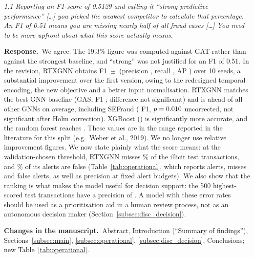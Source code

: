 \documentclass[11pt]{article}
\newenvironment{comment}{\par\medskip\noindent\begin{minipage}{\linewidth}\itshape\color{black!75}}{\end{minipage}\par\smallskip}
\newcommand{\resp}{\par\noindent\textbf{Response.}\ }
\newcommand{\change}{\par\noindent\textbf{Changes in the manuscript.}\ }
\begin{document}
\begin{comment}
1.1 Reporting an F1-score of 0.5129 and calling it ``strong predictive performance'' [\dots] you picked the weakest competitor to calculate that percentage. An F1 of 0.51 means you are missing nearly half of all fraud cases [\dots] You need to be more upfront about what this score actually means.
\end{comment}
\resp We agree. The 19.3\% figure was computed against GAT rather than against the strongest baseline, and ``strong'' was not justified for an F1 of 0.51. In the revision, RTXGNN obtains F1 \rtxFone{}\,$\pm$\,\rtxFoneSd{} (precision \rtxPrec, recall \rtxRec, AP \rtxAP) over 10 seeds, a substantial improvement over the first version, owing to the redesigned temporal encoding, the new objective and a better input normalisation. RTXGNN matches the best GNN baseline (GAS, F1 \gasFone; difference not significant) and is ahead of all other GNNs on average, including SEFraud (\deltaFOnesefraud{} F1, $p=0.010$ uncorrected, not significant after Holm correction). XGBoost (\xgbFone) is significantly more accurate, and the random forest reaches \rfFone{}. These values are in the range reported in the literature for this split (e.g.\ Weber et al., 2019). We no longer use relative improvement figures. We now state plainly what the score means: at the validation-chosen threshold, RTXGNN misses \rtxMissPct\% of the \nTestIllicit{} illicit test transactions, and \rtxFDRPct\% of its alerts are false (Table~\ref{tab:operational}, which reports alerts, misses and false alerts, as well as precision at fixed alert budgets). We also show that the ranking is what makes the model useful for decision support: the 500 highest-scored test transactions have a precision of \rtxPrecAtFive{}. A model with these error rates should be used as a prioritisation aid in a human review process, not as an autonomous decision maker (Section~\ref{subsec:disc_decision}).
\change Abstract, Introduction (``Summary of findings''), Sections~\ref{subsec:main}, \ref{subsec:operational}, \ref{subsec:disc_decision}, Conclusions; new Table~\ref{tab:operational}.
\end{document}
